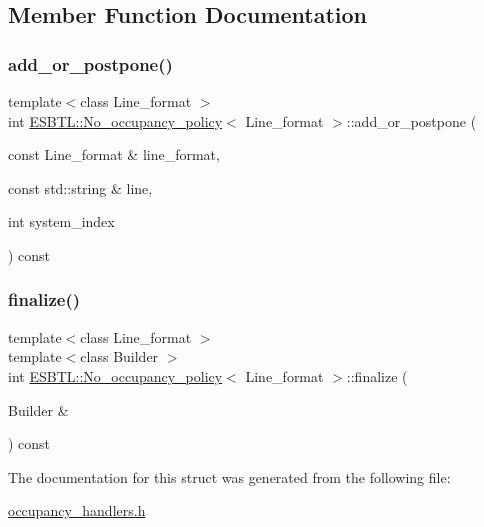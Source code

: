 \subsection{Member Function Documentation}
\mbox{\label{structESBTL_1_1No__occupancy__policy_ae3d1ae3f42e09e938787e349f43b078b}} 
\subsubsection{\texorpdfstring{add\+\_\+or\+\_\+postpone()}{add\_or\_postpone()}}
{\footnotesize\ttfamily template$<$class Line\+\_\+format $>$ \\
int \hyperlink{structESBTL_1_1No__occupancy__policy}{E\+S\+B\+T\+L\+::\+No\+\_\+occupancy\+\_\+policy}$<$ Line\+\_\+format $>$\+::add\+\_\+or\+\_\+postpone (\begin{DoxyParamCaption}\item[{const Line\+\_\+format \&}]{line\+\_\+format,  }\item[{const std\+::string \&}]{line,  }\item[{int}]{system\+\_\+index }\end{DoxyParamCaption}) const\hspace{0.3cm}{\ttfamily [inline]}}

\mbox{\label{structESBTL_1_1No__occupancy__policy_aa8cf0b10f6df8b195d50a0b120784799}} 
\subsubsection{\texorpdfstring{finalize()}{finalize()}}
{\footnotesize\ttfamily template$<$class Line\+\_\+format $>$ \\
template$<$class Builder $>$ \\
int \hyperlink{structESBTL_1_1No__occupancy__policy}{E\+S\+B\+T\+L\+::\+No\+\_\+occupancy\+\_\+policy}$<$ Line\+\_\+format $>$\+::finalize (\begin{DoxyParamCaption}\item[{Builder \&}]{ }\end{DoxyParamCaption}) const\hspace{0.3cm}{\ttfamily [inline]}}



The documentation for this struct was generated from the following file\+:\begin{DoxyCompactItemize}
\item 
\hyperlink{occupancy__handlers_8h}{occupancy\+\_\+handlers.\+h}\end{DoxyCompactItemize}
